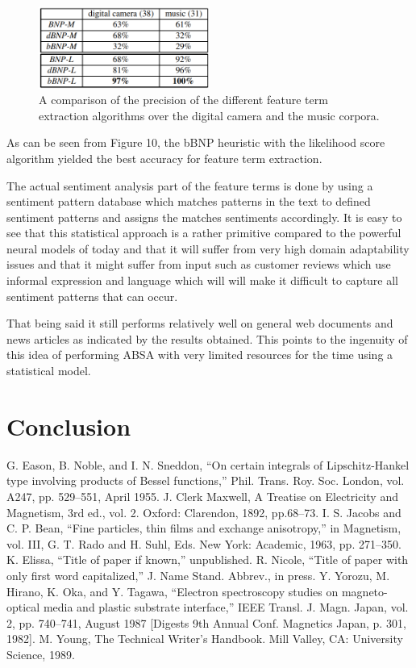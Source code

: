 \documentclass[conference]{IEEEtran}
\begin{document}
\begin{figure}[htbp]
\centerline{\includegraphics[keepaspectratio, width=0.5\textwidth]{pics/14.png}}
\caption{A comparison of the precision of the different feature term extraction algorithms over the digital camera and the music corpora.}
\label{fig}
\end{figure}

As can be seen from Figure 10, the bBNP heuristic with the likelihood score algorithm yielded the best accuracy for feature term extraction.

The actual sentiment analysis part of the feature terms is done by using a sentiment pattern database which matches patterns in the text to defined sentiment patterns and assigns the matches sentiments accordingly. It is easy to see that this statistical approach is a rather primitive compared to the powerful neural models of today and that it will suffer from very high domain adaptability issues and that it might suffer from input such as customer reviews which use informal expression and language which will will make it difficult to capture all sentiment patterns that can occur.

That being said it still performs relatively well on general web documents and news articles as indicated by the results obtained. This points to the ingenuity of this idea of performing ABSA with very limited resources for the time using a statistical model.

\section{Conclusion}

\begin{thebibliography}{00}
 G. Eason, B. Noble, and I. N. Sneddon, ``On certain integrals of Lipschitz-Hankel type involving products of Bessel functions,'' Phil. Trans. Roy. Soc. London, vol. A247, pp. 529--551, April 1955.
 J. Clerk Maxwell, A Treatise on Electricity and Magnetism, 3rd ed., vol. 2. Oxford: Clarendon, 1892, pp.68--73.
 I. S. Jacobs and C. P. Bean, ``Fine particles, thin films and exchange anisotropy,'' in Magnetism, vol. III, G. T. Rado and H. Suhl, Eds. New York: Academic, 1963, pp. 271--350.
 K. Elissa, ``Title of paper if known,'' unpublished.
 R. Nicole, ``Title of paper with only first word capitalized,'' J. Name Stand. Abbrev., in press.
 Y. Yorozu, M. Hirano, K. Oka, and Y. Tagawa, ``Electron spectroscopy studies on magneto-optical media and plastic substrate interface,'' IEEE Transl. J. Magn. Japan, vol. 2, pp. 740--741, August 1987 [Digests 9th Annual Conf. Magnetics Japan, p. 301, 1982].
 M. Young, The Technical Writer's Handbook. Mill Valley, CA: University Science, 1989.
\end{thebibliography}
\end{document}
